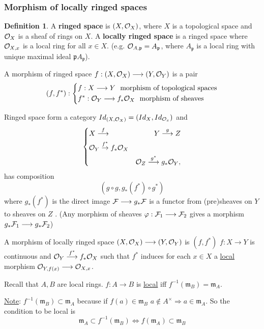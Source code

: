 \documentclass[11pt]{article}
\theoremstyle{definition}
\newtheorem{dfn}[thm]{Definition}
\newcommand{\scm}{{\mathfrak m}}
\newcommand{\scp}{{\mathfrak p}}
\newcommand{\calf}{{\cal F}}
\newcommand{\calo}{{\cal O}}
\newcommand{\rta}{\rightarrow}
\newcommand{\Lrta}{\Longrightarrow}
\newcommand{\lrta}{\longrightarrow}
\newcommand{\Llrta}{\Longleftrightarrow}
\begin{document}
\subsubsection{Morphism of locally ringed spaces}
\begin{dfn}
A \textbf{ringed space} is $(X,\calo_X)$, where $X$ is a topological space and $\calo_X$ is a sheaf of rings  on $X$. A \textbf{locally ringed space} is a ringed space where $\calo_{X,x}$ is a local ring for all $x\in X$. (e.g. $\calo_{A,\scp}=A_\scp$, where $A_\scp$ is a local ring with unique maximal ideal $\scp A_\scp$).

A morphism of ringed space $f:(X,\calo_X)\lrta (Y,\calo_Y)$ is a pair
$$
(f,f^*):\left\{\begin{aligned}
&f:X\lrta Y \ \text{  morphism of topological spaces}\\ 
& f^*:\calo_Y\lrta f_*\calo_X\ \text{ morphism of sheaves}
\end{aligned}
\right.
$$ 
\end{dfn}
Ringed space form a category $Id_{(X,\calo_X)}=(Id_X,Id_{\calo_x})$ and 
$$
\left\{\begin{aligned}
& X\overset{f}{\lrta }&Y\overset{g}{\lrta} Z\\
& \calo_Y\overset{f^*}{\rta}f_*\calo_X&\\
&& \calo_Z\overset{g^*}{\lrta}g_*\calo_Y,
\end{aligned}\right.
$$
has composition
$$
(g\circ g,g_*(f^*)\circ g^*)
$$
where $g_*(f^*)$ is the direct image $\calf\lrta g_*\calf$ is a functor from (pre)sheaves on $Y$ to sheaves on $Z$
.
(Any morphism of sheaves $\varphi:\calf_1\lrta \calf_2$ gives a morphism $g_*\calf_1\lrta g_*\calf_2$)

A morphism of locally ringed space $(X,\calo_X)\lrta (Y,\calo_Y)$
 is $(f,f^*)$ $f:X\lrta Y$ is continuous and $\calo_Y\overset{f^*}{\lrta}f_*\calo_X$ such that $f^*$ induces for each $x\in X$ a \underline{local} morphism 
$\calo_{Y,f(x)}\lrta\calo_{X,x}$.

Recall that $A,B$ are local rings. $f: A\lrta B$ is \underline{local} iff $f^{-1}(\scm_B)=\scm_A$. 

\underline{Note}: $f^{-1}(\scm_B)\subset \scm_A$ because if $f(a)\in \scm_B$ $a\notin A^\times\Lrta a\in \scm_A$. So the condition to be local is 
$$
\scm_A\subset f^{-1}(\scm_B)\Llrta f(\scm_A)\subset \scm_B
$$
\end{document}
